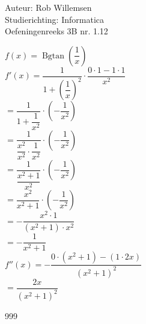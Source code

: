 \documentclass[a4paper]{article}
\begin{document}
\noindent \large Auteur: Rob Willemsen \\
\noindent \large Studierichting: Informatica \\
\noindent \large Oefeningenreeks 3B nr. 1.12 \\

\medskip

\normalsize

$f(x) = \operatorname{Bgtan}(\dfrac{1}{x})$ \\

$f'(x) = \dfrac{1}{1+\left(\dfrac{1}{x}\right)^2} \cdot \dfrac{0 \cdot 1 - 1 \cdot 1}{x^2}$ \\

$= \dfrac{1}{1+\dfrac{1}{x^2}} \cdot \left(-\dfrac{1}{x^2}\right)$ \\

$= \dfrac{1}{\dfrac{x^2}{x^2} \cdot {\dfrac{1}{x^2}}} \cdot \left(-\dfrac{1}{x^2}\right)$ \\

$= \dfrac{1}{\dfrac{x^2+1}{x^2}} \cdot \left(-\dfrac{1}{x^2}\right)$ \\

$= \dfrac{x^2}{x^2+1} \cdot \left(-\dfrac{1}{x^2}\right)$ \\

$= -\dfrac{x^2 \cdot 1}{(x^2+1) \cdot x^2}$ \\

$= -\dfrac{1}{x^2+1}$ \\

$f''(x) = -\dfrac{0 \cdot (x^2+1) - (1 \cdot 2x)}{(x^2+1)^2}$ \\

$= \dfrac{2x}{(x^2+1)^2}$ \\

\begin{thebibliography}{999}
\end{thebibliography}
\end{document}
